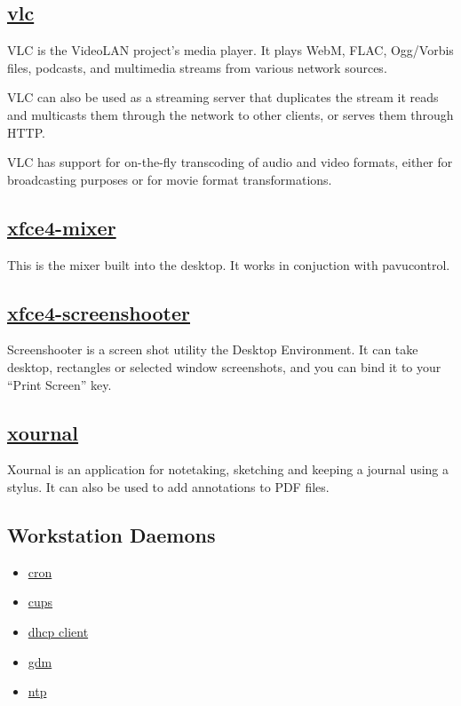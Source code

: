 \subsection{\href{http://www.videolan.org/vlc/}{vlc}}

 VLC is the VideoLAN project's media player. It plays
 WebM, FLAC, Ogg/Vorbis files,
 podcasts, and multimedia streams from various network sources.
 
 VLC can also be used as a streaming server that duplicates the stream it
 reads and multicasts them through the network to other clients, or serves
 them through HTTP.
 
 VLC has support for on-the-fly transcoding of audio and video formats,
 either for broadcasting purposes or for movie format transformations.

\subsection{\href{http://www.xfce.org/}{xfce4-mixer}}

This is the mixer built into the desktop. It works in conjuction with
pavucontrol.

\subsection{\href{http://goodies.xfce.org/projects/applications/xfce4-screenshooter}{xfce4-screenshooter}}

 Screenshooter is a screen shot utility the Desktop Environment. It can take
 desktop, rectangles or selected window screenshots, and you can bind it to
 your ``Print Screen'' key.

\subsection{\href{http://xournal.sourceforge.net/}{xournal}}

 Xournal is an application for notetaking, sketching and
 keeping a journal using a stylus. It can also be used to
 add annotations to PDF files.

\subsection{Workstation Daemons}
\begin{itemize}
\item \href{http://ftp.isc.org/isc/cron/}{cron}
\item \href{http://www.cups.org/}{cups}
\item \href{http://www.isc.org/}{dhcp client}
\item \href{https://wiki.gnome.org/Projects/GDM}{gdm}
\item \href{http://support.ntp.org/}{ntp}
\end{itemize}

